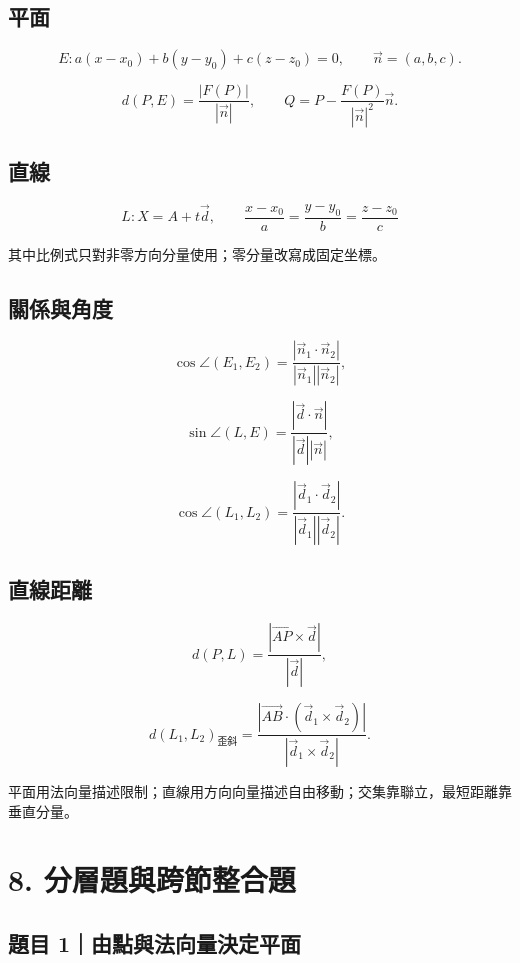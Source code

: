 \documentclass[11pt,a4paper]{article}
\begin{document}
\subsection{平面}\label{ux5e73ux9762}

\[
E:a(x-x_0)+b(y-y_0)+c(z-z_0)=0,
\qquad
\vec n=(a,b,c).
\]

\[
d(P,E)=\frac{|F(P)|}{|\vec n|},
\qquad
Q=P-\frac{F(P)}{|\vec n|^2}\vec n.
\]

\subsection{直線}\label{ux76f4ux7dda}

\[
L:X=A+t\vec d,
\qquad
\frac{x-x_0}{a}=\frac{y-y_0}{b}=\frac{z-z_0}{c}
\]

其中比例式只對非零方向分量使用；零分量改寫成固定坐標。

\subsection{關係與角度}\label{ux95dcux4fc2ux8207ux89d2ux5ea6}

\[
\cos\angle(E_1,E_2)
=\frac{|\vec n_1\cdot\vec n_2|}{|\vec n_1||\vec n_2|},
\]

\[
\sin\angle(L,E)
=\frac{|\vec d\cdot\vec n|}{|\vec d||\vec n|},
\]

\[
\cos\angle(L_1,L_2)
=\frac{|\vec d_1\cdot\vec d_2|}{|\vec d_1||\vec d_2|}.
\]

\subsection{直線距離}\label{ux76f4ux7ddaux8dddux96e2}

\[
d(P,L)=\frac{|\overrightarrow{AP}\times\vec d|}{|\vec d|},
\]

\[
d(L_1,L_2)_{\text{歪斜}}
=\frac{|\overrightarrow{AB}\cdot(\vec d_1\times\vec d_2)|}{|\vec d_1\times\vec d_2|}.
\]

平面用法向量描述限制；直線用方向向量描述自由移動；交集靠聯立，最短距離靠垂直分量。

\section{8. 分層題與跨節整合題}\label{ux5206ux5c64ux984cux8207ux8de8ux7bc0ux6574ux5408ux984c}

\subsection{題目 1｜由點與法向量決定平面}\label{ux984cux76ee-1ux7531ux9edeux8207ux6cd5ux5411ux91cfux6c7aux5b9aux5e73ux9762}
\end{document}
